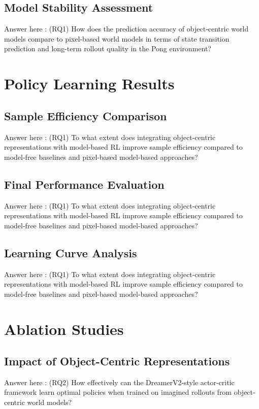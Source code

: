 \documentclass[
	english,
	ruledheaders=section,
	class=report,
	thesis={type=master},
	accentcolor=9c,
	custommargins=true,
	marginpar=false,
	parskip=half-,
	fontsize=11pt,
]{tudapub}
\begin{document}
\subsection{Model Stability Assessment}
\label{subsec:stability}
Answer here : (RQ1) How does the prediction accuracy of object-centric world models compare to pixel-based world models in terms of state transition prediction and long-term rollout quality in the Pong environment?

\section{Policy Learning Results}
\label{sec:policy_results}

\subsection{Sample Efficiency Comparison}
\label{subsec:sample_efficiency_comp}
Answer here : (RQ1) To what extent does integrating object-centric representations with model-based RL improve sample efficiency compared to model-free baselines and pixel-based model-based approaches?


\subsection{Final Performance Evaluation}
\label{subsec:final_performance}
Answer here : (RQ1) To what extent does integrating object-centric representations with model-based RL improve sample efficiency compared to model-free baselines and pixel-based model-based approaches?


\subsection{Learning Curve Analysis}
\label{subsec:learning_curves}
Answer here : (RQ1) To what extent does integrating object-centric representations with model-based RL improve sample efficiency compared to model-free baselines and pixel-based model-based approaches?


\section{Ablation Studies}
\label{sec:ablation_studies}

\subsection{Impact of Object-Centric Representations}
\label{subsec:oc_impact}
Answer here : (RQ2) How effectively can the DreamerV2-style actor-critic framework learn optimal policies when trained on imagined rollouts from object-centric world models?
\end{document}
